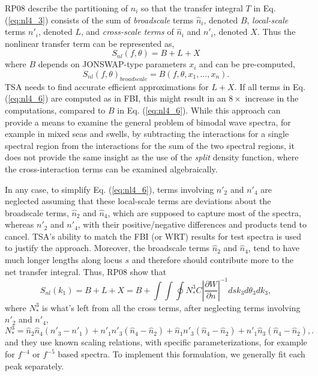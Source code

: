 RP08 describe the partitioning of $n_i$ so that the transfer integral $T$ in Eq. (\ref{eq:nl4_3}) consists of the sum of \textit{broadscale} terms $\hat{n}_i$, denoted $B$, \textit{local-scale} terms $n'_i$, denoted $L$, and \textit{cross-scale terms} of $\hat{n}_i$ and $n'_i$, denoted $X$. Thus the nonlinear transfer term can be represented as,   
\begin{equation}
S_{nl}(f,\theta) = B+L+X \label{eq:nl4_6}
\end{equation}
where $B$ depends on JONSWAP-type parameters $x_i$ and can be pre-computed, 
\begin{equation}
S_{nl}(f,\theta)_{broadscale} = B(f,\theta,x_1,\ldots,x_n). \label{eq:nl4_7}
\end{equation}
TSA needs to find accurate efficient approximations for $L+X$. If all terms in Eq. (\ref{eq:nl4_6}) are computed as in FBI, this might result in an $8\times$ increase in the computations, compared to $B$ in Eq. (\ref{eq:nl4_6}). While this approach can provide a means to examine the general problem of bimodal wave spectra, for example in mixed seas and swells, by subtracting the interactions for a single spectral region from the interactions for the sum of the two spectral regions, it does not provide the same insight as the use of the \textit{split} density function, where the cross-interaction terms can be examined algebraically. 


In any case, to simplify Eq. (\ref{eq:nl4_6}), terms involving  $n'_2$ and $n'_4$  are neglected assuming that these local-scale terms are deviations about the broadscale terms, $\hat{n}_2$ and $\hat{n}_4$, which are supposed to capture most of the spectra, whereas $n'_2$ and $n'_4$, with their positive/negative differences and products tend to cancel. TSA's ability to match the FBI (or WRT) results for test spectra is used to justify the approach. Moreover, the broadscale terms $\hat{n}_2$ and $\hat{n}_4$, tend to have much longer lengths along locus $s$ and therefore should contribute more to the net transfer integral. Thus, RP08 show that 
\begin{equation}
S_{nl}(k_1) = B+L+X=B + \int\int \oint N^3_* C\left| \frac{\partial W}{\partial n} \right|^{-1} ds k_3 d\theta_3dk_3, \label{eq:nl4_8}
\end{equation}                   
where $N^3_*$ is what's left from all the cross terms, after neglecting terms involving  $n'_2$ and $n'_4$,    
\begin{equation}
N^3_*=\hat{n}_2 \hat{n}_4 (n'_3-n'_1)+n'_1 n'_3(\hat{n}_4-\hat{n}_2)+\hat{n}_1n'_3(\hat{n}_4-\hat{n}_2)+n'_1\hat{n}_3(\hat{n}_4-\hat{n}_2),.
\end{equation}
and they use known scaling relations, with specific parameterizations, for example for $f^{-4}$ or $f^{-5}$ based spectra. To implement this formulation, we generally fit each peak separately. 


